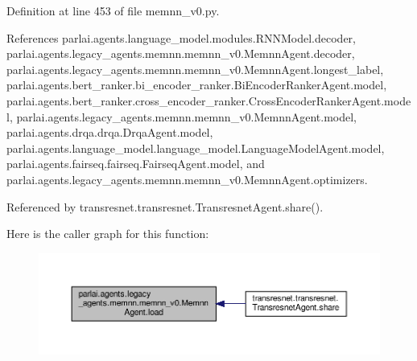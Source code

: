 Definition at line 453 of file memnn\+\_\+v0.\+py.



References parlai.\+agents.\+language\+\_\+model.\+modules.\+R\+N\+N\+Model.\+decoder, parlai.\+agents.\+legacy\+\_\+agents.\+memnn.\+memnn\+\_\+v0.\+Memnn\+Agent.\+decoder, parlai.\+agents.\+legacy\+\_\+agents.\+memnn.\+memnn\+\_\+v0.\+Memnn\+Agent.\+longest\+\_\+label, parlai.\+agents.\+bert\+\_\+ranker.\+bi\+\_\+encoder\+\_\+ranker.\+Bi\+Encoder\+Ranker\+Agent.\+model, parlai.\+agents.\+bert\+\_\+ranker.\+cross\+\_\+encoder\+\_\+ranker.\+Cross\+Encoder\+Ranker\+Agent.\+model, parlai.\+agents.\+legacy\+\_\+agents.\+memnn.\+memnn\+\_\+v0.\+Memnn\+Agent.\+model, parlai.\+agents.\+drqa.\+drqa.\+Drqa\+Agent.\+model, parlai.\+agents.\+language\+\_\+model.\+language\+\_\+model.\+Language\+Model\+Agent.\+model, parlai.\+agents.\+fairseq.\+fairseq.\+Fairseq\+Agent.\+model, and parlai.\+agents.\+legacy\+\_\+agents.\+memnn.\+memnn\+\_\+v0.\+Memnn\+Agent.\+optimizers.



Referenced by transresnet.\+transresnet.\+Transresnet\+Agent.\+share().

Here is the caller graph for this function\+:
\nopagebreak
\begin{figure}[H]
\begin{center}
\leavevmode
\includegraphics[width=350pt]{classparlai_1_1agents_1_1legacy__agents_1_1memnn_1_1memnn__v0_1_1MemnnAgent_a43e08459f9552c66ef389b8727b8eff3_icgraph}
\end{center}
\end{figure}
\mbox{\label{classparlai_1_1agents_1_1legacy__agents_1_1memnn_1_1memnn__v0_1_1MemnnAgent_a0f8358dd299ba6719f7354771938fd7b}} 

